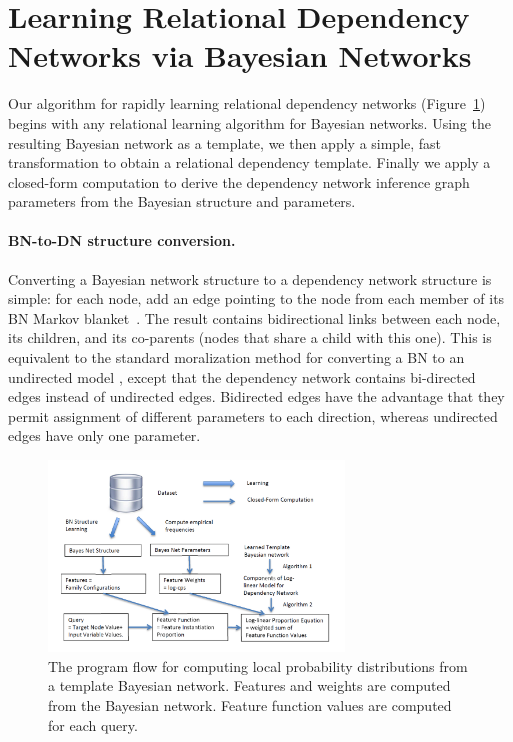 \documentclass[runningheads,a4paper]{llncs}
\begin{document}
\section{Learning Relational Dependency Networks via Bayesian Networks}\label{sect:learning}
Our algorithm for rapidly learning relational dependency networks (Figure~\ref{fig:bn-flow})
begins with any relational learning algorithm for Bayesian networks. Using the resulting Bayesian network as a template, we then apply a simple, fast transformation to obtain a relational dependency template. Finally we apply a closed-form computation to derive the dependency network inference graph parameters from the Bayesian structure and parameters. 
\paragraph{BN-to-DN structure conversion.}
Converting a Bayesian network structure to a dependency network structure is simple: for each node, add an edge pointing to the node from each member of its BN Markov blanket~\cite{Heckerman2000}.  The result contains  bidirectional links between each node, its children, and its co-parents (nodes that share a child with this one). 
%
This is equivalent to the standard moralization  method for converting a BN to an undirected model \cite{Domingos2009}, except that the dependency network contains bi-directed edges instead of undirected edges. Bidirected edges have the advantage that they permit  assignment of different parameters to each direction, whereas undirected edges have only one parameter. 
\begin{figure}[t]
\begin{center}
\includegraphics[width=0.7\textwidth]{bn-regress.png}
\caption{The program flow for computing local probability distributions from a template Bayesian network. Features and weights are computed from the Bayesian network. Feature function values are computed for each query. \label{fig:bn-flow}}
\end{center}
\end{figure}
\end{document}
